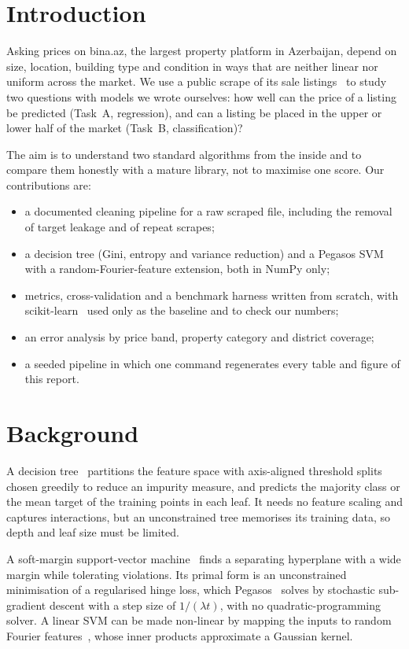 \documentclass[10pt,twocolumn,a4paper]{article}
\begin{document}
\section{Introduction}
Asking prices on bina.az, the largest property platform in Azerbaijan,
depend on size, location, building type and condition in ways that are
neither linear nor uniform across the market. We use a public scrape of
its sale listings~\cite{dataset} to study two questions with models we
wrote ourselves: how well can the price of a listing be predicted
(Task~A, regression), and can a listing be placed in the upper or lower
half of the market (Task~B, classification)?

The aim is to understand two standard algorithms from the inside and to
compare them honestly with a mature library, not to maximise one score.
Our contributions are:
\begin{itemize}
  \item a documented cleaning pipeline for a raw scraped file, including
        the removal of target leakage and of repeat scrapes;
  \item a decision tree (Gini, entropy and variance reduction) and a
        Pegasos SVM with a random-Fourier-feature extension, both in
        NumPy only;
  \item metrics, cross-validation and a benchmark harness written from
        scratch, with scikit-learn~\cite{sklearn} used only as the
        baseline and to check our numbers;
  \item an error analysis by price band, property category and district
        coverage;
  \item a seeded pipeline in which one command regenerates every table
        and figure of this report.
\end{itemize}

\section{Background}
A decision tree~\cite{cart} partitions the feature space with
axis-aligned threshold splits chosen greedily to reduce an impurity
measure, and predicts the majority class or the mean target of the
training points in each leaf. It needs no feature scaling and captures
interactions, but an unconstrained tree memorises its training data, so
depth and leaf size must be limited.

A soft-margin support-vector machine~\cite{svm} finds a separating
hyperplane with a wide margin while tolerating violations. Its primal
form is an unconstrained minimisation of a regularised hinge loss, which
Pegasos~\cite{pegasos} solves by stochastic sub-gradient descent with a
step size of $1/(\lambda t)$, with no quadratic-programming solver. A
linear SVM can be made non-linear by mapping the inputs to random
Fourier features~\cite{rff}, whose inner products approximate a Gaussian
kernel.
\end{document}
